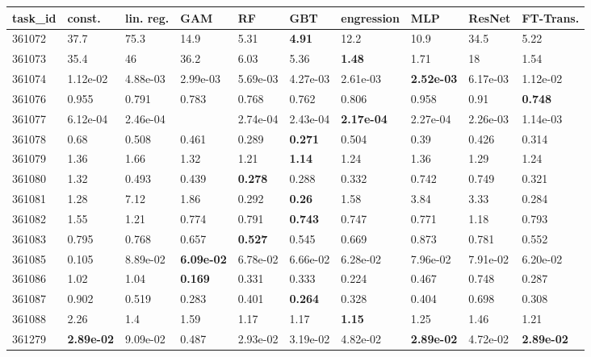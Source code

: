 \begin{table}[ht!]
\centering
\begingroup\footnotesize
\begin{tabular}{llllllllll}
  \hline
\hline
task\_id & const. & lin. reg. & GAM & RF & GBT & engression & MLP & ResNet & FT-Trans. \\ 
  \hline
361072 & 37.7 & 75.3 & 14.9 & 5.31 & \textbf{4.91} & 12.2 & 10.9 & 34.5 & 5.22 \\ 
  361073 & 35.4 & 46 & 36.2 & 6.03 & 5.36 & \textbf{1.48} & 1.71 & 18 & 1.54 \\ 
  361074 & 1.12e-02 & 4.88e-03 & 2.99e-03 & 5.69e-03 & 4.27e-03 & 2.61e-03 & \textbf{2.52e-03} & 6.17e-03 & 1.12e-02 \\ 
  361076 & 0.955 & 0.791 & 0.783 & 0.768 & 0.762 & 0.806 & 0.958 & 0.91 & \textbf{0.748} \\ 
  361077 & 6.12e-04 & 2.46e-04 &  & 2.74e-04 & 2.43e-04 & \textbf{2.17e-04} & 2.27e-04 & 2.26e-03 & 1.14e-03 \\ 
  361078 & 0.68 & 0.508 & 0.461 & 0.289 & \textbf{0.271} & 0.504 & 0.39 & 0.426 & 0.314 \\ 
  361079 & 1.36 & 1.66 & 1.32 & 1.21 & \textbf{1.14} & 1.24 & 1.36 & 1.29 & 1.24 \\ 
  361080 & 1.32 & 0.493 & 0.439 & \textbf{0.278} & 0.288 & 0.332 & 0.742 & 0.749 & 0.321 \\ 
  361081 & 1.28 & 7.12 & 1.86 & 0.292 & \textbf{0.26} & 1.58 & 3.84 & 3.33 & 0.284 \\ 
  361082 & 1.55 & 1.21 & 0.774 & 0.791 & \textbf{0.743} & 0.747 & 0.771 & 1.18 & 0.793 \\ 
  361083 & 0.795 & 0.768 & 0.657 & \textbf{0.527} & 0.545 & 0.669 & 0.873 & 0.781 & 0.552 \\ 
  361085 & 0.105 & 8.89e-02 & \textbf{6.09e-02} & 6.78e-02 & 6.66e-02 & 6.28e-02 & 7.96e-02 & 7.91e-02 & 6.20e-02 \\ 
  361086 & 1.02 & 1.04 & \textbf{0.169} & 0.331 & 0.333 & 0.224 & 0.467 & 0.748 & 0.287 \\ 
  361087 & 0.902 & 0.519 & 0.283 & 0.401 & \textbf{0.264} & 0.328 & 0.404 & 0.698 & 0.308 \\ 
  361088 & 2.26 & 1.4 & 1.59 & 1.17 & 1.17 & \textbf{1.15} & 1.25 & 1.46 & 1.21 \\ 
  361279 & \textbf{2.89e-02} & 9.09e-02 & 0.487 & 2.93e-02 & 3.19e-02 & 4.82e-02 & \textbf{2.89e-02} & 4.72e-02 & \textbf{2.89e-02} \\ 

\end{tabular}
\end{table}

